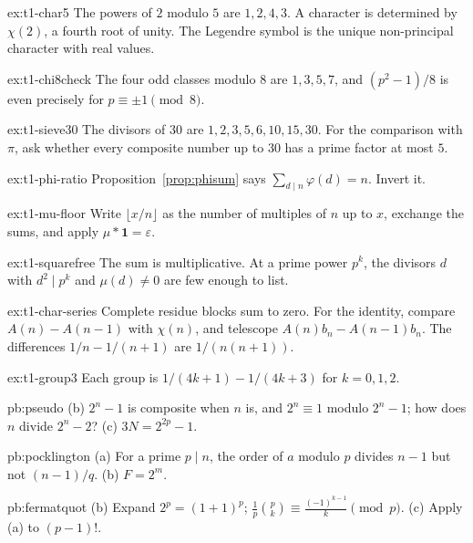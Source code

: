 \begin{hint}{ex:t1-char5}
The powers of $2$ modulo $5$ are $1,2,4,3$. A character is determined by $\chi(2)$, a fourth root of unity. The Legendre symbol is the unique non-principal character with real values.
\end{hint}
\begin{hint}{ex:t1-chi8check}
The four odd classes modulo $8$ are $1,3,5,7$, and $(p^2-1)/8$ is even precisely for $p\equiv\pm1\pmod8$.
\end{hint}
\begin{hint}{ex:t1-sieve30}
The divisors of $30$ are $1,2,3,5,6,10,15,30$. For the comparison with $\pi$, ask whether every composite number up to $30$ has a prime factor at most $5$.
\end{hint}
\begin{hint}{ex:t1-phi-ratio}
Proposition~\ref{prop:phisum} says $\sum_{d\mid n}\varphi(d)=n$. Invert it.
\end{hint}
\begin{hint}{ex:t1-mu-floor}
Write $\lfloor x/n\rfloor$ as the number of multiples of $n$ up to $x$, exchange the sums, and apply $\mu*\mathbf1=\varepsilon$.
\end{hint}
\begin{hint}{ex:t1-squarefree}
The sum is multiplicative. At a prime power $p^k$, the divisors $d$ with $d^2\mid p^k$ and $\mu(d)\ne0$ are few enough to list.
\end{hint}
\begin{hint}{ex:t1-char-series}
Complete residue blocks sum to zero. For the identity, compare $A(n)-A(n-1)$ with $\chi(n)$, and telescope $A(n)b_n-A(n-1)b_n$. The differences $1/n-1/(n+1)$ are $1/(n(n+1))$.
\end{hint}

\begin{hint}{ex:t1-group3}
Each group is $1/(4k+1)-1/(4k+3)$ for $k=0,1,2$.
\end{hint}

\begin{hint}{pb:pseudo}
(b) $2^n-1$ is composite when $n$ is, and $2^n\equiv1$ modulo $2^n-1$; how does $n$ divide $2^n-2$? (c) $3N=2^{2p}-1$.
\end{hint}

\begin{hint}{pb:pocklington}
(a) For a prime $p\mid n$, the order of $a$ modulo $p$ divides $n-1$ but not $(n-1)/q$. (b) $F=2^m$.
\end{hint}

\begin{hint}{pb:fermatquot}
(b) Expand $2^p=(1+1)^p$; $\frac1p\binom pk\equiv\frac{(-1)^{k-1}}k\pmod p$. (c) Apply (a) to $(p-1)!$.
\end{hint}

